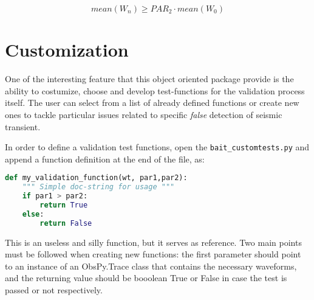 \documentclass[11pt,a4paper,twocolumns]{article}
\begin{document}
\begin{equation}
	mean(W_{n}) \geqslant PAR_{2} \cdot mean(W_{0})
	\label{eq:test2}
\end{equation}

\section{Customization}
\label{sec:custom}
One of the interesting feature that this object oriented package provide is the ability to costumize, choose and develop test-functions for the validation process itself. The user can select from a list of already defined functions or create new ones to tackle particular issues related to specific \emph{false} detection of seismic transient.

In order to define a validation test functions, open the \texttt{bait\_customtests.py} and append a function definition at the end of the file, as:
\begin{lstlisting}[language=Python]
def my_validation_function(wt, par1,par2):
	""" Simple doc-string for usage """
	if par1 > par2:
		return True
	else:
		return False	
\end{lstlisting}
This is an useless and silly function, but it serves as reference. Two main points must be followed when creating new functions: the first parameter should point to an instance of an ObsPy.Trace class that contains the necessary waveforms, and the returning value should be booolean True or False in case the test is passed or not respectively.






\printbibliography
\end{document}
